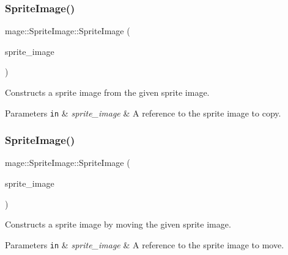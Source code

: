 \subsubsection{\texorpdfstring{Sprite\+Image()}{SpriteImage()}\hspace{0.1cm}{\footnotesize\ttfamily [5/6]}}
{\footnotesize\ttfamily mage\+::\+Sprite\+Image\+::\+Sprite\+Image (\begin{DoxyParamCaption}\item[{const \hyperlink{classmage_1_1_sprite_image}{Sprite\+Image} \&}]{sprite\+\_\+image }\end{DoxyParamCaption})}

Constructs a sprite image from the given sprite image.


\begin{DoxyParams}[1]{Parameters}
\mbox{\tt in}  & {\em sprite\+\_\+image} & A reference to the sprite image to copy. \\
\hline
\end{DoxyParams}
\hypertarget{classmage_1_1_sprite_image_ae1ea5c900498c8ecdf5dd3131d056dd5}{}\label{classmage_1_1_sprite_image_ae1ea5c900498c8ecdf5dd3131d056dd5} 
\subsubsection{\texorpdfstring{Sprite\+Image()}{SpriteImage()}\hspace{0.1cm}{\footnotesize\ttfamily [6/6]}}
{\footnotesize\ttfamily mage\+::\+Sprite\+Image\+::\+Sprite\+Image (\begin{DoxyParamCaption}\item[{\hyperlink{classmage_1_1_sprite_image}{Sprite\+Image} \&\&}]{sprite\+\_\+image }\end{DoxyParamCaption})\hspace{0.3cm}{\ttfamily [default]}}

Constructs a sprite image by moving the given sprite image.


\begin{DoxyParams}[1]{Parameters}
\mbox{\tt in}  & {\em sprite\+\_\+image} & A reference to the sprite image to move. \\
\hline
\end{DoxyParams}
\hypertarget{classmage_1_1_sprite_image_a9121ee110f7e64ee6e936e0d3350ab44}{}\label{classmage_1_1_sprite_image_a9121ee110f7e64ee6e936e0d3350ab44} 
